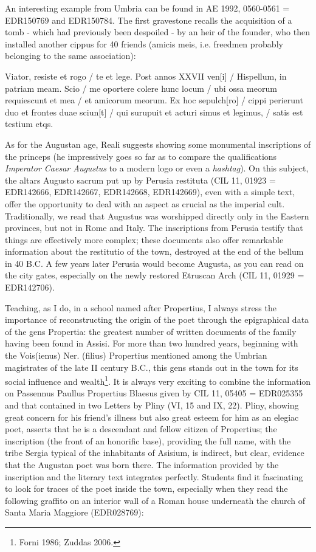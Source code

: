 \documentclass[amsthm,ebook]{saparticle}
\begin{document}
An interesting example from Umbria can be found in AE 1992, 0560-0561 = EDR150769 and EDR150784. The first gravestone
recalls the acquisition of a tomb - which had previously been despoiled - by an heir of the founder, who then installed
another cippus for 40 friends (amicis meis, i.e. freedmen probably belonging to the same association):

Viator, resiste et rogo / te et lege. Post annos XXVII ven[i] / Hispellum, in patriam meam. Scio / me oportere colere
hunc locum / ubi ossa meorum requiescunt et mea / et amicorum meorum. Ex hoc sepulch[ro] / cippi perierunt duo et
frontes duae sciun[t] / qui surupuit et acturi simus et legimus, / satis est testium etqs.

As for the Augustan age, Reali suggests showing some monumental inscriptions of the princeps (he impressively goes so
far as to compare the qualifications \emph{Imperator Caesar Augustus} to a modern logo or even a \emph{hashtag}). On
this subject, the altars Augusto sacrum put up by Perusia restituta (CIL 11, 01923 = EDR142666, EDR142667, EDR142668,
EDR142669), even with a simple text, offer the opportunity to deal with an aspect as crucial as the imperial cult.
Traditionally, we read that Augustus was worshipped directly only in the Eastern provinces, but not in Rome and Italy.
The inscriptions from Perusia testify that things are effectively more complex; these documents also offer remarkable
information about the restitutio of the town, destroyed at the end of the bellum in 40 B.C. A few years later Perusia
would become Augusta, as you can read on the city gates, especially on the newly restored Etruscan Arch (CIL 11, 01929
= EDR142706).

Teaching, as I do, in a school named after Propertius, I always stress the importance of reconstructing the origin of
the poet through the epigraphical data of the gens Propertia: the greatest number of written documents of the family
having been found in Assisi. For more than two hundred years, beginning with the Vois(ienus) Ner. (filius) Propertius
mentioned among the Umbrian magistrates of the late II century B.C., this gens stands out in the town for its social
influence and wealth\footnote{ Forni 1986; Zuddas 2006.}. It is always very exciting to combine the information on
Passennus Paullus Propertius Blaesus given by CIL 11, 05405 = EDR025355 and that contained in two Letters by Pliny (VI,
15 and IX, 22). Pliny, showing great concern for his friend’s illness but also great esteem for him as an elegiac poet,
asserts that he is a descendant and fellow citizen of Propertius; the inscription (the front of an honorific base),
providing the full name, with the tribe Sergia typical of the inhabitants of Asisium, is indirect, but clear, evidence
that the Augustan poet was born there. The information provided by the inscription and the literary text integrates
perfectly. Students find it fascinating to look for traces of the poet inside the town, especially when they read the
following graffito on an interior wall of a Roman house underneath the church of Santa Maria Maggiore (EDR028769):
\end{document}
